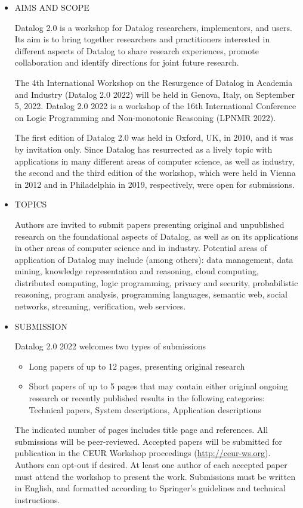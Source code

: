 \documentclass[prodmode,acmtecs]{acmsmall} %
\begin{document}
\begin{itemize}\item  AIMS AND SCOPE 
 
  Datalog 2.0 is a workshop for Datalog researchers, implementors, and users. Its aim is to bring together researchers and practitioners interested in different aspects of Datalog to share research experiences, promote collaboration and identify directions for joint future research. 
 
  The 4th International Workshop on the Resurgence of Datalog in Academia and Industry (Datalog 2.0 2022) will be held in Genova, Italy, on September 5, 2022. Datalog 2.0 2022 is a workshop of the 16th International Conference on Logic Programming and Non-monotonic Reasoning (LPNMR 2022). 
 
  The first edition of Datalog 2.0 was held in Oxford, UK, in 2010, and it was by invitation only. Since Datalog has resurrected as a lively topic with applications in many different areas of computer science, as well as industry, the second and the third edition of the workshop, which were held in Vienna in 2012 and in Philadelphia in 2019, respectively, were open for submissions.  
 
\item  TOPICS  
 
  Authors are invited to submit papers presenting original and unpublished research on the foundational aspects of Datalog, as well as on its applications in other areas of computer science and in industry. Potential areas of application of Datalog may include (among others): data management, data mining, knowledge representation and reasoning, cloud computing, distributed computing, logic programming, privacy and security, probabilistic reasoning, program analysis, programming languages, semantic web, social networks, streaming, verification, web services.  
 
\item  SUBMISSION 
 
 Datalog 2.0 2022 welcomes two types of submissions 
 
\begin{itemize}\item  Long papers of up to 12 pages, presenting original research 
\item  Short papers of up to 5 pages that may contain either original ongoing research or recently published results in the following categories: Technical papers,  System descriptions,  Application descriptions
\end{itemize} 
  The indicated number of pages includes title page and references. All submissions will be peer-reviewed. Accepted papers will be submitted for publication in the CEUR Workshop proceedings (\href{http://ceur-ws.org}{http://ceur-ws.org}). Authors can opt-out if desired. At least one author of each accepted paper must attend the workshop to present the work. Submissions must be written in English, and formatted according to Springer's guidelines and technical instructions.  
 

\end{itemize}
\end{document}
